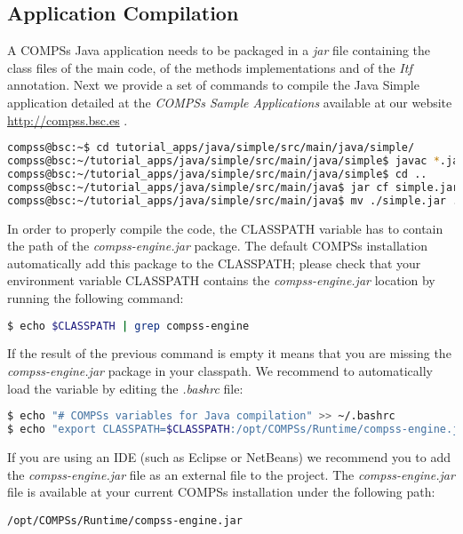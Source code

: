\subsection{Application Compilation}
A COMPSs Java application needs to be packaged in a \textit{jar} file containing the class files of the main code, of the methods implementations and of the \textit{Itf} annotation.
Next we provide a set of commands to compile the Java Simple application detailed at the \textit{COMPSs Sample Applications} 
available at our website \url{http://compss.bsc.es} .
\begin{lstlisting}[language=bash]
compss@bsc:~$ cd tutorial_apps/java/simple/src/main/java/simple/
compss@bsc:~/tutorial_apps/java/simple/src/main/java/simple$ javac *.java
compss@bsc:~/tutorial_apps/java/simple/src/main/java/simple$ cd ..
compss@bsc:~/tutorial_apps/java/simple/src/main/java$ jar cf simple.jar simple/
compss@bsc:~/tutorial_apps/java/simple/src/main/java$ mv ./simple.jar ../../../jar/
\end{lstlisting}

In order to properly compile the code, the CLASSPATH variable has to contain the path of the \textit{compss-engine.jar} package. The default COMPSs
installation automatically add this package to the CLASSPATH; please check that your environment variable CLASSPATH contains the \textit{compss-engine.jar} location by running the following command:
\begin{lstlisting}[language=bash]
$ echo $CLASSPATH | grep compss-engine
\end{lstlisting}
If the result of the previous command is empty it means that you are missing the \textit{compss-engine.jar} package in your classpath. 
We recommend to automatically load the variable by editing the \textit{.bashrc} file:
\begin{lstlisting}[language=bash]
$ echo "# COMPSs variables for Java compilation" >> ~/.bashrc
$ echo "export CLASSPATH=$CLASSPATH:/opt/COMPSs/Runtime/compss-engine.jar" >> ~/.bashrc
\end{lstlisting}

If you are using an IDE (such as Eclipse or NetBeans) we recommend you to add the \textit{compss-engine.jar} file as an external file 
to the project. The \textit{compss-engine.jar} file is available at your current COMPSs installation under the following path:

\verb|/opt/COMPSs/Runtime/compss-engine.jar|


